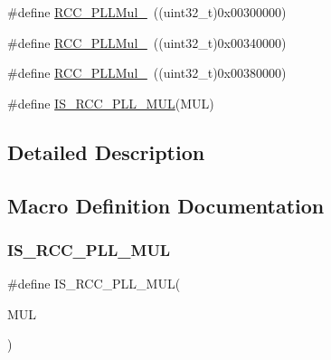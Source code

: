\begin{DoxyCompactItemize}
\item 
\#define \hyperlink{group___p_l_l__multiplication__factor_ga457e11adfe1e815eeb5f38de61a94328}{R\+C\+C\+\_\+\+P\+L\+L\+Mul\+\_}~((uint32\+\_\+t)0x00300000)
\item 
\#define \hyperlink{group___p_l_l__multiplication__factor_gaad1fbc2e251391b4c469e39ccf05d642}{R\+C\+C\+\_\+\+P\+L\+L\+Mul\+\_}~((uint32\+\_\+t)0x00340000)
\item 
\#define \hyperlink{group___p_l_l__multiplication__factor_ga98118a80e57ed822485df8a8bef3cb1f}{R\+C\+C\+\_\+\+P\+L\+L\+Mul\+\_}~((uint32\+\_\+t)0x00380000)
\item 
\#define \hyperlink{group___p_l_l__multiplication__factor_gaad04edea77632618678f528dcb2b0cd5}{I\+S\+\_\+\+R\+C\+C\+\_\+\+P\+L\+L\+\_\+\+M\+UL}(M\+UL)
\end{DoxyCompactItemize}


\subsection{Detailed Description}


\subsection{Macro Definition Documentation}
\mbox{\label{group___p_l_l__multiplication__factor_gaad04edea77632618678f528dcb2b0cd5}} 
\subsubsection{\texorpdfstring{I\+S\+\_\+\+R\+C\+C\+\_\+\+P\+L\+L\+\_\+\+M\+UL}{IS\_RCC\_PLL\_MUL}}
{\footnotesize\ttfamily \#define I\+S\+\_\+\+R\+C\+C\+\_\+\+P\+L\+L\+\_\+\+M\+UL(\begin{DoxyParamCaption}\item[{}]{M\+UL }\end{DoxyParamCaption})}

